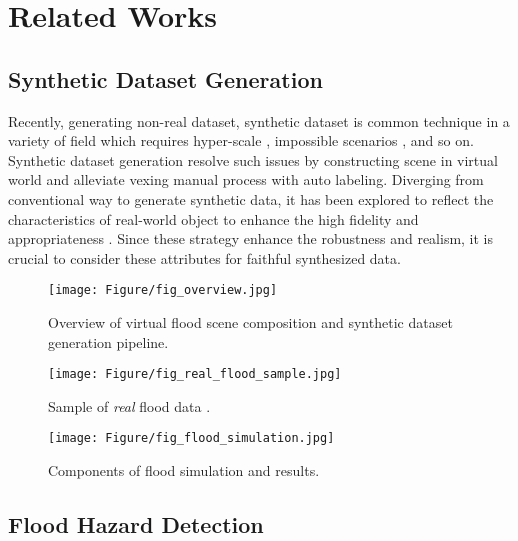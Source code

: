 \section{Related Works}
\subsection{Synthetic Dataset Generation}
\label{sec:rel_work_syntehtic}

Recently, generating non-real dataset, synthetic dataset is common technique in a variety of field which requires hyper-scale  \cite{shang2024urbanworld, ref25Greff2022KubricAS, refzhang2024cityx, refxie2024citydreamer, refwu2024unique3d, refschieber2024indoor, shang2024urbanworld, wang2024high, hao2024synthetic, zhu2024odgen, valvano2024controllable}, impossible scenarios     \cite{refjung2024harnessing,ref25Greff2022KubricAS, refhummel2019leveraging, mittal2023orbit, kokosza2024scintilla, amador2024cyclogenesis}, and so on. Synthetic dataset generation resolve such issues by constructing scene in virtual world and alleviate vexing manual process with auto labeling. Diverging from conventional way to generate synthetic data, it has been explored to reflect the characteristics of real-world object to enhance the high fidelity and appropriateness   \cite{refrichter2022enhancing, lee2024learning, ebadi2022psp}. Since these strategy enhance the robustness and realism, it is crucial to consider these attributes for faithful synthesized data.

\begin{figure*}[t]
    \centerline{\texttt{[image: Figure/fig\_overview.jpg]}}
    \caption{Overview of virtual flood scene composition and synthetic dataset generation pipeline.}
    \label{fig:overview}
\end{figure*}

\begin{figure}[t]
    \centerline{\texttt{[image: Figure/fig\_real\_flood\_sample.jpg]}}
    \caption{Sample of \textit{real} flood data   \cite{wan2024automatic}.}
    \label{fig:real_flood}
\end{figure}

\begin{figure}[t]
    \centerline{\texttt{[image: Figure/fig\_flood\_simulation.jpg]}}
    \caption{Components of flood simulation and results.}
    \label{fig:flood_simulation}
\end{figure}

\subsection{Flood Hazard Detection} \label{sec:rel_work_flood}

